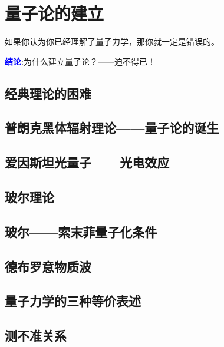 \chapter{量子论的建立}
\begin{center}
    \textcolor[RGB]{255, 0, 0}{\faHeart}如果你认为你已经理解了量子力学，那你就一定是错误的。\textcolor[RGB]{255, 0, 0}{\faHeart}
\end{center}
\vspace{-5pt}
\begin{center}
\end{center}



\textcolor{blue}{\bfseries 结论}:为什么建立量子论？——迫不得已！


\section{经典理论的困难}


\section{普朗克黑体辐射理论——量子论的诞生}


\section{爱因斯坦光量子——光电效应}


\section{玻尔理论}


\section{玻尔——索末菲量子化条件}


\section{德布罗意物质波}


\section{量子力学的三种等价表述}


\section{测不准关系}




